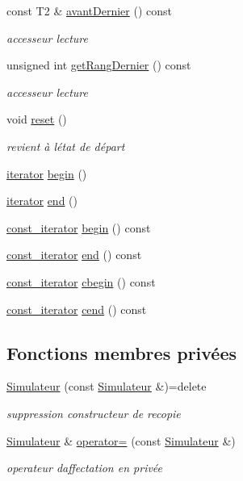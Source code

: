 \begin{DoxyCompactItemize}
const T2 \& \hyperlink{class_simulateur_aca4b266c11eb65f61c0cb958d4232c0f}{avant\+Dernier} () const 
\begin{DoxyCompactList}\small\item\em accesseur lecture \end{DoxyCompactList}\item 
unsigned int \hyperlink{class_simulateur_afc98cbe3954590d6185b8c7c5d9fddd4}{get\+Rang\+Dernier} () const 
\begin{DoxyCompactList}\small\item\em accesseur lecture \end{DoxyCompactList}\item 
void \hyperlink{class_simulateur_a13ab6b17b05b2e70f2677543da4bde29}{reset} ()
\begin{DoxyCompactList}\small\item\em revient à l\textquotesingle{}état de départ \end{DoxyCompactList}\item 
\hyperlink{class_simulateur_1_1iterator}{iterator} \hyperlink{class_simulateur_aed5c2fe918140f59e51b39045263fe95}{begin} ()
\item 
\hyperlink{class_simulateur_1_1iterator}{iterator} \hyperlink{class_simulateur_aa9b6cc97791d4a46672ad5f4c998e6b2}{end} ()
\item 
\hyperlink{class_simulateur_1_1const__iterator}{const\+\_\+iterator} \hyperlink{class_simulateur_a0d59edd64a07747beae2532b1bcf822a}{begin} () const 
\item 
\hyperlink{class_simulateur_1_1const__iterator}{const\+\_\+iterator} \hyperlink{class_simulateur_a1fb0351ecf22dc11327914a1aba67081}{end} () const 
\item 
\hyperlink{class_simulateur_1_1const__iterator}{const\+\_\+iterator} \hyperlink{class_simulateur_a8efcc9d5d6c025fc139c3ad53c6323de}{cbegin} () const 
\item 
\hyperlink{class_simulateur_1_1const__iterator}{const\+\_\+iterator} \hyperlink{class_simulateur_aa69d1c52944b844cb45953ea063e20d2}{cend} () const 
\end{DoxyCompactItemize}
\subsection*{Fonctions membres privées}
\begin{DoxyCompactItemize}
\item 
\hyperlink{class_simulateur_a4d31da226a22b706e9f67311b517dad8}{Simulateur} (const \hyperlink{class_simulateur}{Simulateur} \&)=delete
\begin{DoxyCompactList}\small\item\em suppression constructeur de recopie \end{DoxyCompactList}\item 
\hyperlink{class_simulateur}{Simulateur} \& \hyperlink{class_simulateur_a60d23b4aa969fb25147147875fccafbb}{operator=} (const \hyperlink{class_simulateur}{Simulateur} \&)
\begin{DoxyCompactList}\small\item\em operateur d\textquotesingle{}affectation en privée \end{DoxyCompactList}\end{DoxyCompactItemize}
